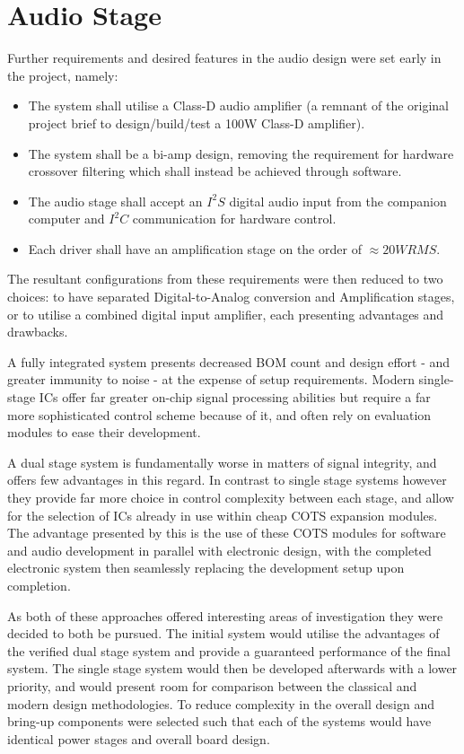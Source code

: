 \documentclass[main.tex]{subfiles}
\begin{document}
\section{Audio Stage}

Further requirements and desired features in the audio design were set early in the project, namely:
\begin{itemize}
    \item The system shall utilise a Class-D audio amplifier (a remnant of the original project brief to design/build/test a 100W Class-D amplifier).
    \item The system shall be a bi-amp design, removing the requirement for hardware crossover filtering which shall instead be achieved through software. 
    \item The audio stage shall accept an $I^{2}S$ digital audio input from the companion computer and $I^{2}C$ communication for hardware control.
    \item Each driver shall have an amplification stage on the order of $\approx20W RMS$.
\end{itemize}

The resultant configurations from these requirements were then reduced to two choices: to have separated Digital-to-Analog conversion and Amplification stages, or to utilise a combined digital input amplifier, each presenting advantages and drawbacks.
\par
A fully integrated system presents decreased BOM count and design effort - and greater immunity to noise - at the expense of setup requirements. Modern single-stage ICs offer far greater on-chip signal processing abilities but require a far more sophisticated control scheme because of it, and often rely on evaluation modules to ease their development. 
\par
A dual stage system is fundamentally worse in matters of signal integrity, and offers few advantages in this regard. In contrast to single stage systems however they provide far more choice in control complexity between each stage, and allow for the selection of ICs already in use within cheap COTS expansion modules. The advantage presented by this is the use of these COTS modules for software and audio development in parallel with electronic design, with the completed electronic system then seamlessly replacing the development setup upon completion.
\par
As both of these approaches offered interesting areas of investigation they were decided to both be pursued. The initial system would utilise the advantages of the verified dual stage system and provide a guaranteed performance of the final system. The single stage system would then be developed afterwards with a lower priority, and would present room for comparison between the classical and modern design methodologies. To reduce complexity in the overall design and bring-up components were selected such that each of the systems would have identical power stages and overall board design.
\end{document}
